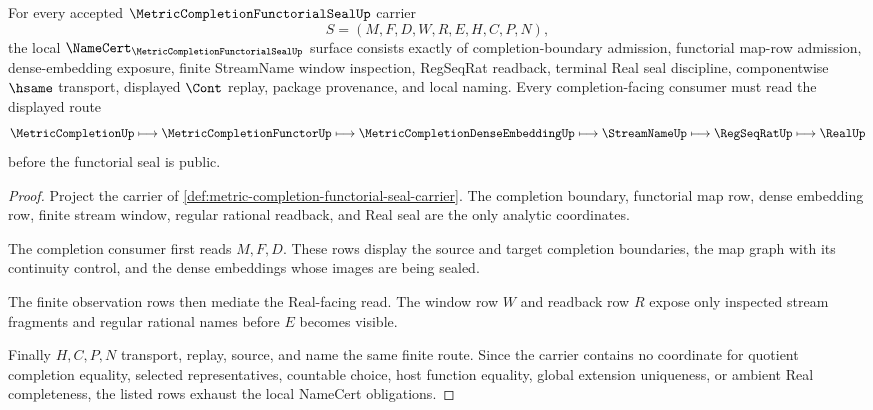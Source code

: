 \begin{theorem}
\label{thm:metric-completion-functorial-seal-namecert-obligations}
For every accepted $\MetricCompletionFunctorialSealUp$ carrier
$$
S=(M,F,D,W,R,E,H,C,P,N),
$$
the local $\NameCert_{\MetricCompletionFunctorialSealUp}$ surface consists exactly of completion-boundary admission, functorial map-row admission, dense-embedding exposure, finite StreamName window inspection, RegSeqRat readback, terminal Real seal discipline, componentwise $\hsame$ transport, displayed $\Cont$ replay, package provenance, and local naming. Every completion-facing consumer must read the displayed route
$$
\MetricCompletionUp \longmapsto \MetricCompletionFunctorUp \longmapsto \MetricCompletionDenseEmbeddingUp \longmapsto \StreamNameUp \longmapsto \RegSeqRatUp \longmapsto \RealUp
$$
before the functorial seal is public.
\end{theorem}
\begin{proof}
Project the carrier of \autoref{def:metric-completion-functorial-seal-carrier}. The completion boundary, functorial map row, dense embedding row, finite stream window, regular rational readback, and Real seal are the only analytic coordinates.

The completion consumer first reads $M,F,D$. These rows display the source and target completion boundaries, the map graph with its continuity control, and the dense embeddings whose images are being sealed.

The finite observation rows then mediate the Real-facing read. The window row $W$ and readback row $R$ expose only inspected stream fragments and regular rational names before $E$ becomes visible.

Finally $H,C,P,N$ transport, replay, source, and name the same finite route. Since the carrier contains no coordinate for quotient completion equality, selected representatives, countable choice, host function equality, global extension uniqueness, or ambient Real completeness, the listed rows exhaust the local NameCert obligations.
\end{proof}

